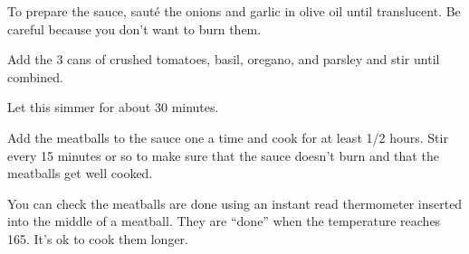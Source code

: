 \begin{IngredientsAndSteps}
    {}


    {
        To prepare the sauce, sauté the onions and garlic in olive oil until translucent. Be careful because you don't want to burn
        them.

        Add the 3 cans of crushed tomatoes, basil, oregano, and parsley and stir until combined.

        Let this simmer for about 30 minutes.
    }


    {
        Add the meatballs to the sauce one a time and cook for at least 1/2 hours. Stir every 15 minutes or so to make
        sure that the sauce doesn't burn and that the meatballs get well cooked.

        You can check the meatballs are done using an instant read thermometer inserted into the middle of a meatball.
        They are ``done'' when the temperature reaches 165\Degrees[F]. It's ok to cook them longer.
    }
\end{IngredientsAndSteps}

%
%
%
%
\newpage



